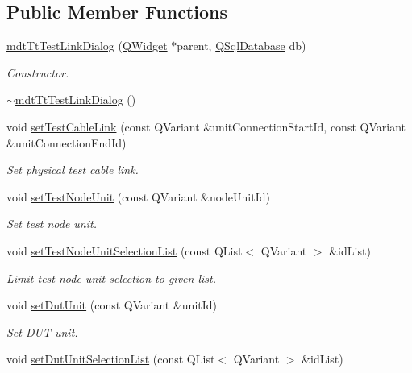 \subsection*{Public Member Functions}
\begin{DoxyCompactItemize}
\item 
\hyperlink{classmdt_tt_test_link_dialog_ac65efc1af939c5059176651d65d3c7ae}{mdt\-Tt\-Test\-Link\-Dialog} (\hyperlink{class_q_widget}{Q\-Widget} $\ast$parent, \hyperlink{class_q_sql_database}{Q\-Sql\-Database} db)
\begin{DoxyCompactList}\small\item\em Constructor. \end{DoxyCompactList}\item 
\hyperlink{classmdt_tt_test_link_dialog_a5732e2c5680256dd468540ae47172fbe}{$\sim$mdt\-Tt\-Test\-Link\-Dialog} ()
\item 
void \hyperlink{classmdt_tt_test_link_dialog_aeb588d5930d26eb1bd45dc0fdb505b6b}{set\-Test\-Cable\-Link} (const Q\-Variant \&unit\-Connection\-Start\-Id, const Q\-Variant \&unit\-Connection\-End\-Id)
\begin{DoxyCompactList}\small\item\em Set physical test cable link. \end{DoxyCompactList}\item 
void \hyperlink{classmdt_tt_test_link_dialog_a0816b61e02e5b82699bdbc2fdedb098f}{set\-Test\-Node\-Unit} (const Q\-Variant \&node\-Unit\-Id)
\begin{DoxyCompactList}\small\item\em Set test node unit. \end{DoxyCompactList}\item 
void \hyperlink{classmdt_tt_test_link_dialog_a05d0bcebecccd2bcc59aa1d8e1d04e05}{set\-Test\-Node\-Unit\-Selection\-List} (const Q\-List$<$ Q\-Variant $>$ \&id\-List)
\begin{DoxyCompactList}\small\item\em Limit test node unit selection to given list. \end{DoxyCompactList}\item 
void \hyperlink{classmdt_tt_test_link_dialog_a0a67dbfcdac8800ef091fc040539b148}{set\-Dut\-Unit} (const Q\-Variant \&unit\-Id)
\begin{DoxyCompactList}\small\item\em Set D\-U\-T unit. \end{DoxyCompactList}\item 
void \hyperlink{classmdt_tt_test_link_dialog_a02daf0a705e224f518a6ba67ffbe1df4}{set\-Dut\-Unit\-Selection\-List} (const Q\-List$<$ Q\-Variant $>$ \&id\-List)

\end{DoxyCompactItemize}
